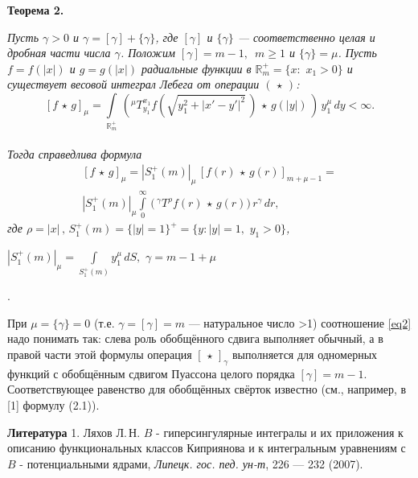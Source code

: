 {\bf Теорема 2.}  {\it    Пусть $\gamma{>}0$ и $\gamma=[\gamma]+\{\gamma\}$, где $[\gamma]$ и $\{\gamma\}$ --- соответственно целая и дробная части числа $\gamma$.
Положим $[\gamma]=m-1, \,\,\,m\geqslant1$ и $\{\gamma\}=\mu$. Пусть $f=f(|x|)$ и
$g=g(|x|)$ радиальные функции в $\mathbb{R}^+_m=\{x:\,\,x_1>0\}$ и существует весовой интеграл Лебега от операции $(\,\star\,)$:
$$
[f\,\star\,g]_\mu=\int\limits_{\mathbb{R}^+_m}\,\left(^\mu T^{x_1}_{y_1}f(\sqrt{y_1^2+
|x'-y'|^2}\,)\,\star\,g(|y|)\,\right)\,y_1^\mu\,dy<\infty.
$$ \\
Тогда справедлива формула
\begin{equation}\label{eq2}
\begin{array}{cccc}
[f\,\star\,g]_\mu=|S_1^+(m)|_\mu\, \left[f(r)\,\star\,g(r)\right]_{m+\mu-1} =\\
|S^+_1(m)|_\mu\int\limits_0^\infty \,\biggl(\,^\gamma T^\rho f(r)\,\star\,g(r)
\biggl)\,r^\gamma\,dr,
\end{array}
\end{equation}
где  $\rho=|x|\,, \,S^+_1(m){=}\{|y|{=}1\}^+{=}\{y:|y|{=}1,\,\,y_1>0\}$,

$
|S_1^+(m)|_\mu{=}\int\limits_{S_1^+(m)} y_1^\mu\,dS,$  $\gamma{=}m{-}1{+}\mu$}.

 При $\mu=\{\gamma\}=0$ (т.е. $\gamma=[\gamma]=m$ --- натуральное число >1) соотношение \eqref{eq2} надо понимать так:
 слева роль обобщённого сдвига выполняет обычный, а в правой части этой формулы операция $[\,\star\,]_\gamma$ выполняется для одномерных функций с обобщённым сдвигом Пуассона целого порядка $[\gamma]=m-1$. Соответствующее равенство для обобщённых свёрток известно   (см., например,  в [1] формулу (2.1)).

{\bf Литература}
1. Ляхов Л.\,Н. $B$ - гиперсингулярные интегралы и их приложения к описанию функциональных классов Киприянова и к интегральным уравнениям с $B$ - потенциальными ядрами,  {\it Липецк. гос. пед. ун-т}, 226 --- 232 (2007).

